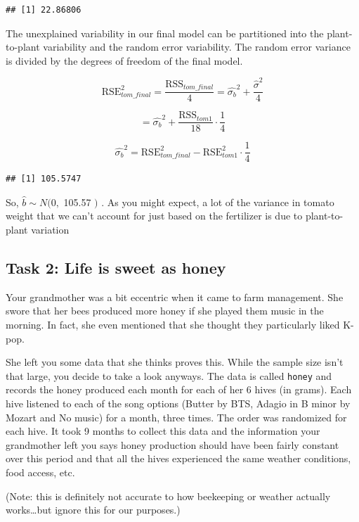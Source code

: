 \documentclass[
  openany]{book}
\begin{document}
\begin{verbatim}
## [1] 22.86806
\end{verbatim}

The unexplained variability in our final model can be partitioned into the plant-to-plant variability and the random error variability. The random error variance is divided by the degrees of freedom of the final model.

\[\text{RSE}_{tom\_final}^2 = \frac{\text{RSS}_{tom\_final}}{4} = \hat{\sigma_b}^2 +  \frac{\hat{\sigma}^2}{4}\]

\[ = \hat{\sigma_b}^2 + \frac{\text{RSS}_{tom1}}{18}\cdot\frac{1}{4}\]

\[\hat{\sigma_b}^2 = \text{RSE}_{tom\_final}^2 - \text{RSE}^2_{tom1} \cdot\frac{1}{4}\]

\begin{verbatim}
## [1] 105.5747
\end{verbatim}

So, \(\hat{b} \sim N(0,\) 105.57 \()\) . As you might expect, a lot of the variance in tomato weight that we can't account for just based on the fertilizer is due to plant-to-plant variation

\hypertarget{task-2-life-is-sweet-as-honey}{%
\subsection{Task 2: Life is sweet as honey}\label{task-2-life-is-sweet-as-honey}}

Your grandmother was a bit eccentric when it came to farm management. She swore that her bees produced more honey if she played them music in the morning. In fact, she even mentioned that she thought they particularly liked K-pop.

She left you some data that she thinks proves this. While the sample size isn't that large, you decide to take a look anyways. The data is called \texttt{honey} and records the honey produced each month for each of her 6 hives (in grams). Each hive listened to each of the song options (Butter by BTS, Adagio in B minor by Mozart and No music) for a month, three times. The order was randomized for each hive. It took 9 months to collect this data and the information your grandmother left you says honey production should have been fairly constant over this period and that all the hives experienced the same weather conditions, food access, etc.

(Note: this is definitely not accurate to how beekeeping or weather actually works\ldots but ignore this for our purposes.)
\end{document}
